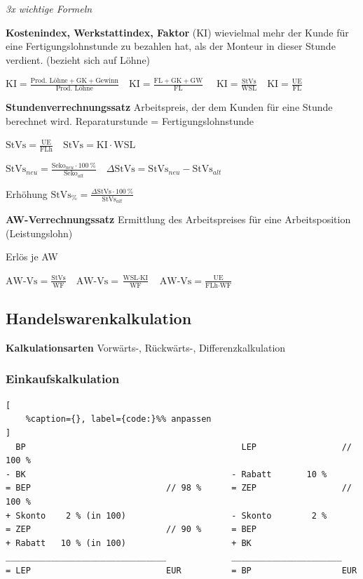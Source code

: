 \emph{3x wichtige Formeln}

\textbf{Kostenindex, Werkstattindex, Faktor} (KI) wievielmal mehr der
Kunde für eine Fertigungslohnstunde zu bezahlen hat, als der Monteur in
dieser Stunde verdient. (bezieht sich auf Löhne)

$\boxed{\text{KI} = \frac{\text{Prod. Löhne} + \text{GK} + \text{Gewinn}}{\text{Prod. Löhne}}} \quad \boxed{\text{KI} = \frac{\text{FL} + \text{GK} + \text{GW}}{\text{FL}}} \quad$
$\boxed{\text{KI} = \frac{\text{StVs}}{\text{WSL}}} \quad \boxed{\text{KI} = \frac{\text{UE}}{\text{FL}}}$

\textbf{Stundenverrechnungssatz} Arbeitspreis, der dem Kunden für eine
Stunde berechnet wird. Reparaturstunde = Fertigungslohnstunde

$\boxed{\text{StVs} = \frac{\text{UE}}{\text{FLh}}} \quad \boxed{\text{StVs} = \text{KI} \cdot \text{WSL}}$

$\boxed{\text{StVs}_{neu} = \frac{\text{Seko}_{neu} \cdot 100~\%}{\text{Seko}_{alt}}} \quad \boxed{\Delta \text{StVs} = \text{StVs}_{neu} - \text{StVs}_{alt}}$

Erhöhung
$\boxed{\text{StVs}_\% = \frac{\Delta \text{StVs} \cdot 100~\%}{\text{StVs}_{alt}}}$

\textbf{AW-Verrechnungssatz} Ermittlung des Arbeitspreises für eine
Arbeitsposition (Leistungslohn)

Erlös je AW

$\boxed{\text{AW-Vs} = \frac{\text{StVs}}{\text{WF}}} \quad \boxed{\text{AW-Vs} = \frac{\text{WSL} \cdot \text{KI}}{\text{WF}}} \quad \boxed{\text{AW-Vs} = \frac{\text{UE}}{\text{FLh} \cdot \text{WF}}}$

\newpage

\subsection{Handelswarenkalkulation}\label{handelswarenkalkulation}

\textbf{Kalkulationsarten} Vorwärts-, Rückwärts-, Differenzkalkulation

\subsubsection{Einkaufskalkulation}\label{einkaufskalkulation}

\lstset{language=Python}%
\begin{lstlisting}[
	%caption={}, label={code:}%% anpassen
]
  BP                                           LEP                 // 100 %
- BK                                         - Rabatt       10 %                 
= BEP                           // 98 %      = ZEP                 // 100 % 
+ Skonto    2 % (in 100)                     - Skonto        2 %
= ZEP                           // 90 %      = BEP                 
+ Rabatt   10 % (in 100)                     + BK
________________________________             ______________________         
= LEP                           EUR          = BP                  EUR 
\end{lstlisting}

